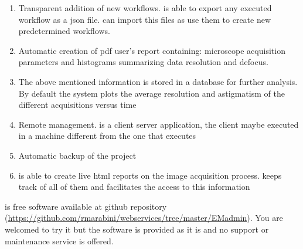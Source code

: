 \begin{enumerate}
 \item Transparent addition of new workflows. \scipion is able to export any executed workflow as a json file. \emadmin can import this files as use them to create new predetermined workflows.
 \item Automatic creation of pdf user's report containing: microscope acquisition parameters and histograms summarizing data resolution and  defocus. 
 \item The above mentioned information is stored in a database for further analysis. By default the system plots the  average resolution and astigmatism of the different acquisitions versus time
 \item Remote management. \emadmin is a client server application, the client maybe executed in a machine different from the one that executes \scipion
 \item Automatic backup of the \scipion project
 \item \scipion is able to create live html reports on the image acquisition process. \emadmin keeps track of all of them and facilitates the access to this information
\end{enumerate}

\emadmin is free software available at github repository (\url{https://github.com/rmarabini/webservices/tree/master/EMadmin}). You are welcomed to try it but the software is provided as it is and no support or maintenance service is offered. 

